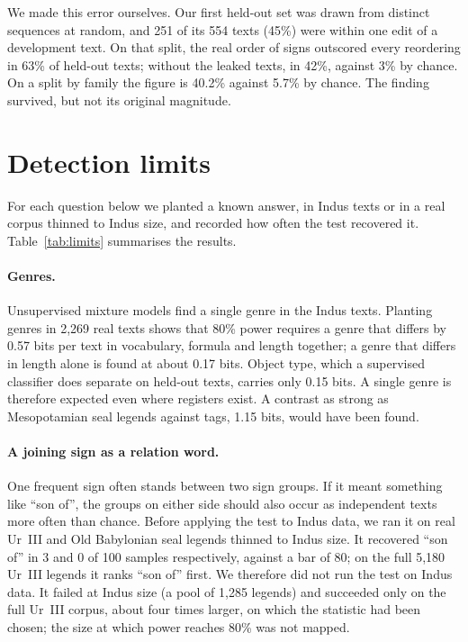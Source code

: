 \documentclass[11pt,a4paper]{article}
\begin{document}
We made this error ourselves. Our first held-out set was drawn from distinct sequences at random, and 251 of its 554 texts (45\%) were within one edit of a development text. On that split, the real order of signs outscored every reordering in 63\% of held-out texts; without the leaked texts, in 42\%, against 3\% by chance. On a split by family the figure is 40.2\% against 5.7\% by chance. The finding survived, but not its original magnitude.

\section{Detection limits}
\label{sec:limits}

For each question below we planted a known answer, in Indus texts or in a real corpus thinned to Indus size, and recorded how often the test recovered it. Table~\ref{tab:limits} summarises the results.

\paragraph{Genres.} Unsupervised mixture models find a single genre in the Indus texts. Planting genres in 2,269 real texts shows that 80\% power requires a genre that differs by 0.57 bits per text in vocabulary, formula and length together; a genre that differs in length alone is found at about 0.17 bits. Object type, which a supervised classifier does separate on held-out texts, carries only 0.15 bits. A single genre is therefore expected even where registers exist. A contrast as strong as Mesopotamian seal legends against tags, 1.15 bits, would have been found.

\paragraph{A joining sign as a relation word.} One frequent sign often stands between two sign groups. If it meant something like ``son of'', the groups on either side should also occur as independent texts more often than chance. Before applying the test to Indus data, we ran it on real Ur~III and Old Babylonian seal legends thinned to Indus size. It recovered ``son of'' in 3 and 0 of 100 samples respectively, against a bar of 80; on the full 5,180 Ur~III legends it ranks ``son of'' first. We therefore did not run the test on Indus data. It failed at Indus size (a pool of 1,285 legends) and succeeded only on the full Ur~III corpus, about four times larger, on which the statistic had been chosen; the size at which power reaches 80\% was not mapped.
\end{document}
